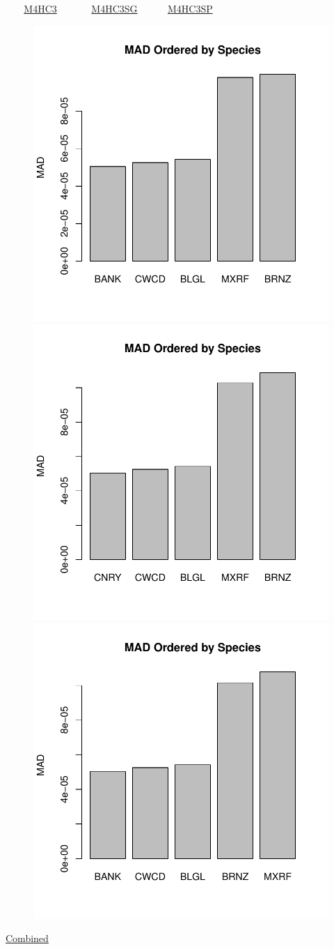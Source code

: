 \documentclass[ xcolor = pdftex, dvipsnames, table ]{beamer}
\begin{document}
\begin{frame}{$~~~~~~~$ \href{https://github.com/gasduster99/sppComp/tree/master/sscRuns/25019781982M4HC3}{M4HC3} $~~~~~~~~~~~~~$ \href{https://github.com/gasduster99/sppComp/tree/master/sscRuns/25019781982M4HC3SG}{M4HC3SG} $~~~~~~~~~~~$ \href{https://github.com/gasduster99/sppComp/tree/master/sscRuns/25019781982M4HC3SP}{M4HC3SP} }
        \begin{figure}[ht!]
        \centering
        \hspace*{-1cm}
        \includegraphics[width=.4\textwidth]{../sscRuns/25019781982M4HC3/sppTailMad68.pdf}
        \includegraphics[width=.4\textwidth]{../sscRuns/25019781982M4HC3SG/sppTailMad68.pdf}
        \includegraphics[width=.4\textwidth]{../sscRuns/25019781982M4HC3SP/sppTailMad68.pdf}
        \end{figure}
	\vspace{-1cm}
	\begin{center}
	\Large
	\href{https://github.com/gasduster99/sppComp/tree/master/try1/postSSC/25019781982M4HC3SPSG}{Combined}
	\end{center}
\end{frame}
\end{document}
